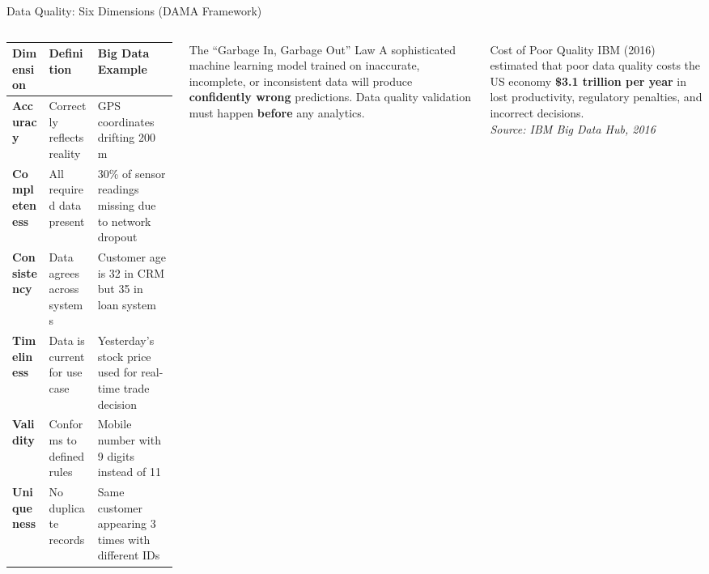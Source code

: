 \documentclass[aspectratio=169,10pt]{beamer}
\begin{document}
\begin{frame}{Data Quality: Six Dimensions (DAMA Framework)}
  \begin{columns}[T]
      \renewcommand{\arraystretch}{1.4}
      \begin{tabular}{p{2.0cm}p{2.5cm}p{2.6cm}}
        \toprule
        \textbf{Dimension} & \textbf{Definition} & \textbf{Big Data Example} \\
        \midrule
        \textbf{Accuracy}    & Correctly reflects reality & GPS coordinates drifting 200 m \\
        \textbf{Completeness} & All required data present & 30\% of sensor readings missing due to network dropout \\
        \textbf{Consistency} & Data agrees across systems & Customer age is 32 in CRM but 35 in loan system \\
        \textbf{Timeliness}  & Data is current for use case & Yesterday's stock price used for real-time trade decision \\
        \textbf{Validity}    & Conforms to defined rules & Mobile number with 9 digits instead of 11 \\
        \textbf{Uniqueness}  & No duplicate records & Same customer appearing 3 times with different IDs \\
        \bottomrule
      \end{tabular}

      \begin{alertblock}{The ``Garbage In, Garbage Out'' Law}
        A sophisticated machine learning model trained on inaccurate, incomplete, or inconsistent data will produce \textbf{confidently wrong} predictions.  Data quality validation must happen \textbf{before} any analytics.
      \end{alertblock}
      \vspace{6pt}
      \begin{exampleblock}{Cost of Poor Quality}
        \small IBM (2016) estimated that poor data quality costs the US economy \textbf{\$3.1 trillion per year} in lost productivity, regulatory penalties, and incorrect decisions.\\
        \vspace{2pt}
        \textit{Source: IBM Big Data Hub, 2016}
      \end{exampleblock}
  \end{columns}
\end{frame}
\end{document}
